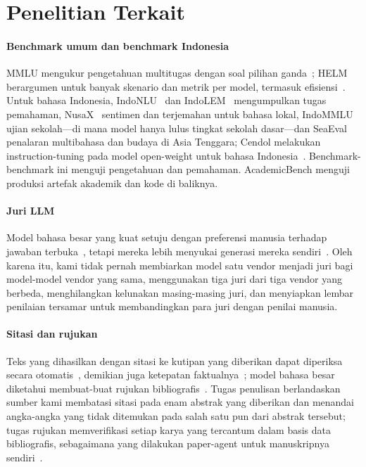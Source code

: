\section{Penelitian Terkait}
\label{sec:related}

\paragraph{Benchmark umum dan benchmark Indonesia} MMLU mengukur pengetahuan multitugas dengan soal pilihan ganda~\cite{hendrycks2021mmlu}; HELM berargumen untuk banyak skenario dan metrik per model, termasuk efisiensi~\cite{liang2023helm}. Untuk bahasa Indonesia, IndoNLU~\cite{wilie2020indonlu} dan IndoLEM~\cite{koto2020indolem} mengumpulkan tugas pemahaman, NusaX~\cite{winata2023nusax} sentimen dan terjemahan untuk bahasa lokal, IndoMMLU~\cite{koto2023indommlu} ujian sekolah---di mana model hanya lulus tingkat sekolah dasar---dan SeaEval~\cite{wang2024seaeval} penalaran multibahasa dan budaya di Asia Tenggara; Cendol melakukan instruction-tuning pada model open-weight untuk bahasa Indonesia~\cite{cahyawijaya2024cendol}. Benchmark-benchmark ini menguji pengetahuan dan pemahaman. AcademicBench menguji produksi artefak akademik dan kode di baliknya.

\paragraph{Juri LLM} Model bahasa besar yang kuat setuju dengan preferensi manusia terhadap jawaban terbuka~\cite{zheng2023judging,liu2023geval,chiang2023human}, tetapi mereka lebih menyukai generasi mereka sendiri~\cite{panickssery2024selfpref}. Oleh karena itu, kami tidak pernah membiarkan model satu vendor menjadi juri bagi model-model vendor yang sama, menggunakan tiga juri dari tiga vendor yang berbeda, menghilangkan kelunakan masing-masing juri, dan menyiapkan lembar penilaian tersamar untuk membandingkan para juri dengan penilai manusia.

\paragraph{Sitasi dan rujukan} Teks yang dihasilkan dengan sitasi ke kutipan yang diberikan dapat diperiksa secara otomatis~\cite{gao2023alce}, demikian juga ketepatan faktualnya~\cite{min2023factscore}; model bahasa besar diketahui membuat-buat rujukan bibliografis~\cite{walters2023fabrication,huang2025hallucination}. Tugas penulisan berlandaskan sumber kami membatasi sitasi pada enam abstrak yang diberikan dan menandai angka-angka yang tidak ditemukan pada salah satu pun dari abstrak tersebut; tugas rujukan memverifikasi setiap karya yang tercantum dalam basis data bibliografis, sebagaimana yang dilakukan paper-agent untuk manuskripnya sendiri~\cite{arya2026paperagent}.

